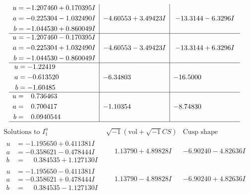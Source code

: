 \documentclass[1p]{elsarticle_modified}
\theoremstyle{definition}
\newcommand{\I}{\sqrt{-1}}
\begin{document}
$$\begin{array}{c|c|c}
\begin{aligned}
u &= -1.207460 + 0.170395 I \\
a &= -0.225304 - 1.032490 I \\
b &= -1.044530 + 0.860049 I\end{aligned}
 & -4.60553 + 3.49423 I & -13.3144 - 6.3296 I \\ \hline\begin{aligned}
u &= -1.207460 - 0.170395 I \\
a &= -0.225304 + 1.032490 I \\
b &= -1.044530 - 0.860049 I\end{aligned}
 & -4.60553 - 3.49423 I & -13.3144 + 6.3296 I \\ \hline\begin{aligned}
u &= -1.22419\phantom{ +0.000000I} \\
a &= -0.613520\phantom{ +0.000000I} \\
b &= -1.60485\phantom{ +0.000000I}\end{aligned}
 & -6.34803\phantom{ +0.000000I} & -16.5000\phantom{ +0.000000I} \\ \hline\begin{aligned}
u &= \phantom{-}0.736463\phantom{ +0.000000I} \\
a &= \phantom{-}0.700417\phantom{ +0.000000I} \\
b &= \phantom{-}0.0940544\phantom{ +0.000000I}\end{aligned}
 & -1.10354\phantom{ +0.000000I} & -8.74830\phantom{ +0.000000I}\\
 \hline 
 \end{array}$$\newpage$$\begin{array}{c|c|c}  
\text{Solutions to }I^u_{1}& \I (\text{vol} + \sqrt{-1}CS) & \text{Cusp shape}\\
 \hline 
\begin{aligned}
u &= -1.195650 + 0.411381 I \\
a &= -0.358621 - 0.478444 I \\
b &= \phantom{-}0.384535 + 1.127130 I\end{aligned}
 & \phantom{-}1.13790 + 4.89828 I & -6.90240 - 4.82636 I \\ \hline\begin{aligned}
u &= -1.195650 - 0.411381 I \\
a &= -0.358621 + 0.478444 I \\
b &= \phantom{-}0.384535 - 1.127130 I\end{aligned}
 & \phantom{-}1.13790 - 4.89828 I & -6.90240 + 4.82636 I \\ \hline\begin{aligned}

\end{aligned}
\end{array}$$
\end{document}
